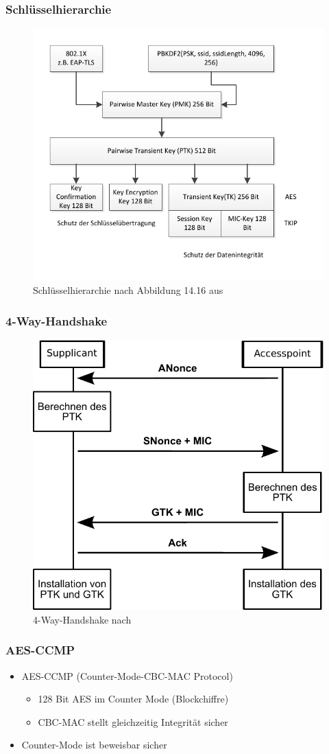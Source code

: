 \documentclass{beamer}
\begin{document}
\begin{frame}
\frametitle{Schlüsselhierarchie}
	\begin{figure}
		\includegraphics[scale=0.7]{figures/key_hier.pdf}
		\caption{Schlüsselhierarchie nach Abbildung 14.16 aus \cite{books/daglib/0008794}}
	\end{figure}
\end{frame}

\begin{frame}
\frametitle{4-Way-Handshake}
\begin{figure}
	\includegraphics[width=0.5\linewidth]{figures/4-way-handshake.pdf}
	\caption{4-Way-Handshake nach \cite{ieee802.11}}
\end{figure}
\end{frame}

\begin{frame}
\frametitle{AES-CCMP}
\begin{itemize}
	\item AES-CCMP (Counter-Mode-CBC-MAC Protocol) 
	\begin{itemize}
		\item 128 Bit AES im Counter Mode (Blockchiffre)
		\item CBC-MAC stellt gleichzeitig Integrität sicher
	\end{itemize}
	\item Counter-Mode ist beweisbar sicher \cite{bellare}
\end{itemize}
\end{frame}
\end{document}
